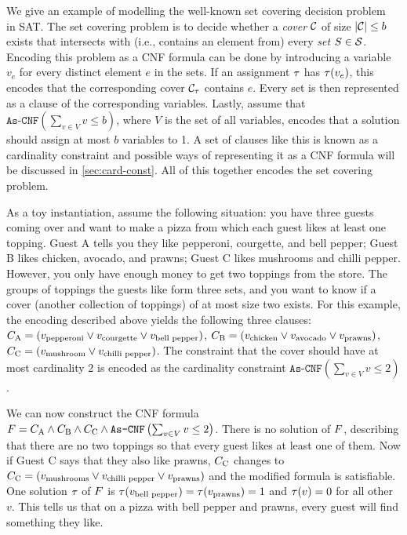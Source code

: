 \begin{example}\label{ex:sat-modelling}
  We give an example of modelling the well-known set covering decision problem~\autocite{DBLP:conf/coco/Karp72} in SAT.
  The set covering problem is to decide whether a \emph{cover} $\mathcal{C}$ of size $|\mathcal{C}|\le b$ exists that intersects with (i.e., contains an element from) every \emph{set} $S \in \mathcal{S}$.
  Encoding this problem as a CNF formula can be done by introducing a variable $v_e$ for every distinct element $e$ in the sets.
  If an assignment $\tau$ has $\tau(v_e)$, this encodes that the corresponding cover $\mathcal{C}_\tau$ contains $e$.
  Every set is then represented as a clause of the corresponding variables.
  Lastly, assume that $\texttt{As-CNF}\left(\sum_{v \in V} v \le b\right)$, where $V$ is the set of all variables, encodes that a solution should assign at most $b$ variables to 1.
  A set of clauses like this is known as a cardinality constraint and possible ways of representing it as a CNF formula will be discussed in \cref{sec:card-const}.
  All of this together encodes the set covering problem.

  As a toy instantiation, assume the following situation:
  you have three guests coming over and want to make a pizza from which each guest likes at least one topping.
  Guest A tells you they like pepperoni, courgette, and bell pepper;
  Guest B likes chicken, avocado, and prawns;
  Guest C likes mushrooms and chilli pepper.
  However, you only have enough money to get two toppings from the store.
  The groups of toppings the guests like form three sets, and you want to know if a cover (another collection of toppings) of at most size two exists.
  For this example, the encoding described above yields the following three clauses:
  $C_\text{A} = (v_\text{pepperoni} \lor v_\text{courgette} \lor v_\text{bell pepper})$, $C_\text{B} = (v_\text{chicken} \lor v_\text{avocado} \lor v_\text{prawns})$, $C_\text{C} = (v_\text{mushroom} \lor v_\text{chilli pepper})$.
  The constraint that the cover should have at most cardinality 2 is encoded as the cardinality constraint $\texttt{As-CNF}\left(\sum_{v \in V} v \le 2\right)$.

  We can now construct the CNF formula $F = C_\text{A} \allowbreak \land C_\text{B} \allowbreak \land C_\text{C} \allowbreak \land \texttt{As-CNF}\left(\sum_{v \in V} v \le 2\right)$.
  There is no solution of $F$, describing that there are no two toppings so that every guest likes at least one of them.
  Now if Guest C says that they also like prawns, $C_\text{C}$ changes to $C_\text{C} = (v_\text{mushrooms} \lor v_\text{chilli pepper} \lor v_\text{prawns})$ and the modified formula is satisfiable.
  One solution $\tau$ of $F$ is $\tau(v_\text{bell pepper}) = \tau(v_\text{prawns}) = 1$ and $\tau(v) = 0$ for all other $v$.
  This tells us that on a pizza with bell pepper and prawns, every guest will find something they like.
\end{example}

